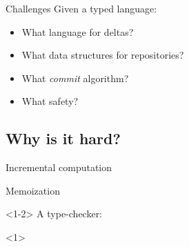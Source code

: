 \documentclass{beamer}
\theoremstyle{example}
\begin{document}
\begin{frame}{Challenges}
  Given a typed language:
  \begin{itemize}
  \item What language for deltas?
  \item What data structures for repositories?
  \item What \emph{commit} algorithm?
  \item What safety?
  \end{itemize}
\end{frame}

\subsection{Why is it hard?}

\begin{frame}[fragile]{Incremental computation}
  \begin{block}{Memoization}\vspace{0.5em}
    \begin{overlayarea}{\textwidth}{.7\textheight}
    \begin{onlyenv}<1-2>
      A type-checker:
      \begin{overlayarea}{\textwidth}{10em}
        \begin{onlyenv}<1>
          \begin{lstlisting}


\end{lstlisting}
\end{onlyenv}
\end{overlayarea}
\end{onlyenv}
\end{overlayarea}
\end{block}
\end{frame}
\end{document}
